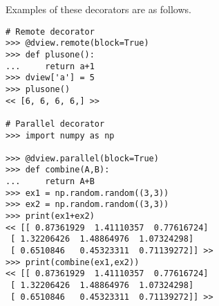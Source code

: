 Examples of these decorators are as follows.

\begin{lstlisting}
# Remote decorator
>>> @dview.remote(block=True)
>>> def plusone():
...     return a+1
>>> dview['a'] = 5
>>> plusone()
<< [6, 6, 6, 6,] >>

# Parallel decorator
>>> import numpy as np

>>> @dview.parallel(block=True)
>>> def combine(A,B):
...     return A+B
>>> ex1 = np.random.random((3,3))
>>> ex2 = np.random.random((3,3))
>>> print(ex1+ex2)
<< [[ 0.87361929  1.41110357  0.77616724]
 [ 1.32206426  1.48864976  1.07324298]
 [ 0.6510846   0.45323311  0.71139272]] >>
>>> print(combine(ex1,ex2))
<< [[ 0.87361929  1.41110357  0.77616724]
 [ 1.32206426  1.48864976  1.07324298]
 [ 0.6510846   0.45323311  0.71139272]] >>
 \end{lstlisting}

